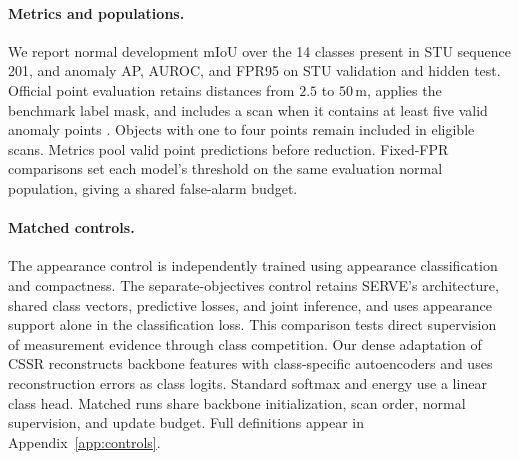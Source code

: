 \documentclass{article}
\begin{document}
\paragraph{Metrics and populations.}
We report normal development mIoU over the 14 classes present in STU sequence 201, and anomaly AP, AUROC, and FPR95 on STU validation and hidden test. Official point evaluation retains distances from $2.5$ to $50$\,m, applies the benchmark label mask, and includes a scan when it contains at least five valid anomaly points \citep{stu}. Objects with one to four points remain included in eligible scans. Metrics pool valid point predictions before reduction. Fixed-FPR comparisons set each model's threshold on the same evaluation normal population, giving a shared false-alarm budget.

\paragraph{Matched controls.}
The appearance control is independently trained using appearance classification and compactness. The separate-objectives control retains SERVE's architecture, shared class vectors, predictive losses, and joint inference, and uses appearance support alone in the classification loss. This comparison tests direct supervision of measurement evidence through class competition. Our dense adaptation of CSSR reconstructs backbone features with class-specific autoencoders and uses reconstruction errors as class logits. Standard softmax and energy use a linear class head. Matched runs share backbone initialization, scan order, normal supervision, and update budget. Full definitions appear in Appendix~\ref{app:controls}.
\end{document}
